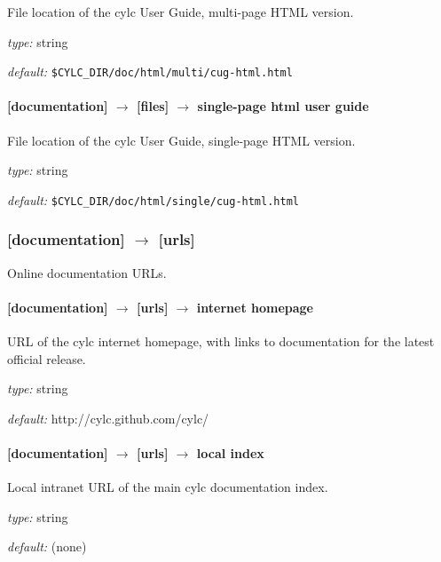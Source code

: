 File location of the cylc User Guide, multi-page HTML version.
\begin{myitemize}
\item {\em type:} string
\item {\em default:} \lstinline=$CYLC_DIR/doc/html/multi/cug-html.html=
\end{myitemize}

\paragraph[single-page html user guide]{[documentation] $\rightarrow$ [files] $\rightarrow$ single-page html user guide }

File location of the cylc User Guide, single-page HTML version.
\begin{myitemize}
\item {\em type:} string
\item {\em default:} \lstinline=$CYLC_DIR/doc/html/single/cug-html.html=
\end{myitemize}

\subsubsection[{[[}urls{]]}]{[documentation] $\rightarrow$ [urls]}

Online documentation URLs.

\paragraph[internet homepage]{[documentation] $\rightarrow$ [urls] $\rightarrow$ internet homepage }

URL of the cylc internet homepage, with links to documentation for the
latest official release.

\begin{myitemize}
\item {\em type:} string
\item {\em default:} http://cylc.github.com/cylc/
\end{myitemize}

\paragraph[local index]{[documentation] $\rightarrow$ [urls] $\rightarrow$ local index}

Local intranet URL of the main cylc documentation index.

\begin{myitemize}
\item {\em type:} string
\item {\em default:} (none)
\end{myitemize}


